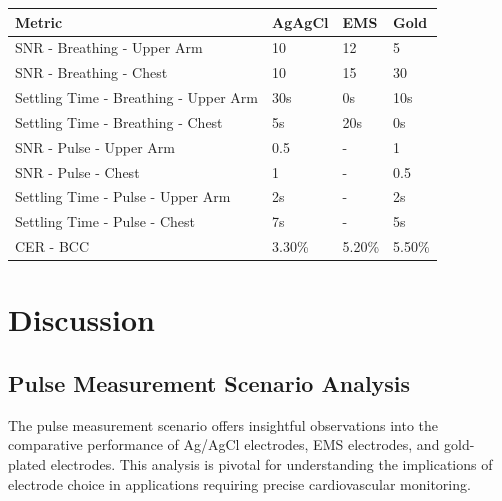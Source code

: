 \documentclass[conference]{IEEEtran}
\begin{document}
\begin{table}[!ht]
    \centering
    \begin{tabular}{|l|l|l|l|}
    \hline
        Metric & AgAgCl & EMS & Gold \\ \hline
        SNR - Breathing - Upper Arm & 10 & 12 & 5 \\ \hline
        SNR - Breathing - Chest & 10 & 15 & 30 \\ \hline
        Settling Time - Breathing - Upper Arm & 30s & 0s & 10s \\ \hline
        Settling Time - Breathing - Chest & 5s & 20s & 0s \\ \hline
        SNR - Pulse - Upper Arm & 0.5 & - & 1 \\ \hline
        SNR - Pulse - Chest & 1 & - & 0.5 \\ \hline
        Settling Time - Pulse - Upper Arm & 2s & - & 2s \\ \hline
        Settling Time - Pulse - Chest & 7s & - & 5s \\ \hline
        CER - BCC & 3.30\% & 5.20\% & 5.50\% \\ \hline
    \end{tabular}
\end{table}

\section{Discussion}

\subsection{Pulse Measurement Scenario Analysis}

The pulse measurement scenario offers insightful observations into the comparative performance of Ag/AgCl electrodes, EMS electrodes, and gold-plated electrodes. This analysis is pivotal for understanding the implications of electrode choice in applications requiring precise cardiovascular monitoring.
\end{document}
